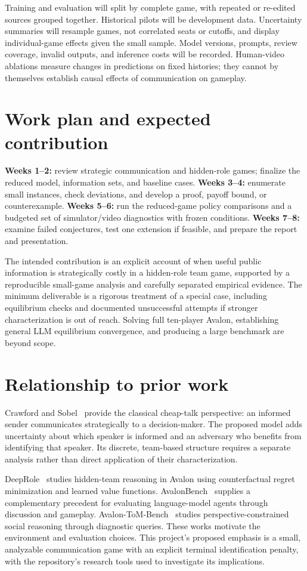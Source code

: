 \documentclass[11pt,letterpaper]{article}
\begin{document}
Training and evaluation will split by complete game, with repeated or re-edited sources grouped together. Historical pilots will be development data. Uncertainty summaries will resample games, not correlated seats or cutoffs, and display individual-game effects given the small sample. Model versions, prompts, review coverage, invalid outputs, and inference costs will be recorded. Human-video ablations measure changes in predictions on fixed histories; they cannot by themselves establish causal effects of communication on gameplay.

\section{Work plan and expected contribution}
\textbf{Weeks 1--2:} review strategic communication and hidden-role games; finalize the reduced model, information sets, and baseline cases.\quad
\textbf{Weeks 3--4:} enumerate small instances, check deviations, and develop a proof, payoff bound, or counterexample.\quad
\textbf{Weeks 5--6:} run the reduced-game policy comparisons and a budgeted set of simulator/video diagnostics with frozen conditions.\quad
\textbf{Weeks 7--8:} examine failed conjectures, test one extension if feasible, and prepare the report and presentation.

The intended contribution is an explicit account of when useful public information is strategically costly in a hidden-role team game, supported by a reproducible small-game analysis and carefully separated empirical evidence. The minimum deliverable is a rigorous treatment of a special case, including equilibrium checks and documented unsuccessful attempts if stronger characterization is out of reach. Solving full ten-player Avalon, establishing general LLM equilibrium convergence, and producing a large benchmark are beyond scope.

\section*{Relationship to prior work}
Crawford and Sobel~\cite{crawford1982} provide the classical cheap-talk perspective: an informed sender communicates strategically to a decision-maker. The proposed model adds uncertainty about which speaker is informed and an adversary who benefits from identifying that speaker. Its discrete, team-based structure requires a separate analysis rather than direct application of their characterization.

DeepRole~\cite{serrino2019} studies hidden-team reasoning in Avalon using counterfactual regret minimization and learned value functions. AvalonBench~\cite{light2023} supplies a complementary precedent for evaluating language-model agents through discussion and gameplay. Avalon-ToM-Bench~\cite{chen2026} studies perspective-constrained social reasoning through diagnostic queries. These works motivate the environment and evaluation choices. This project's proposed emphasis is a small, analyzable communication game with an explicit terminal identification penalty, with the repository's research tools used to investigate its implications.
\end{document}
